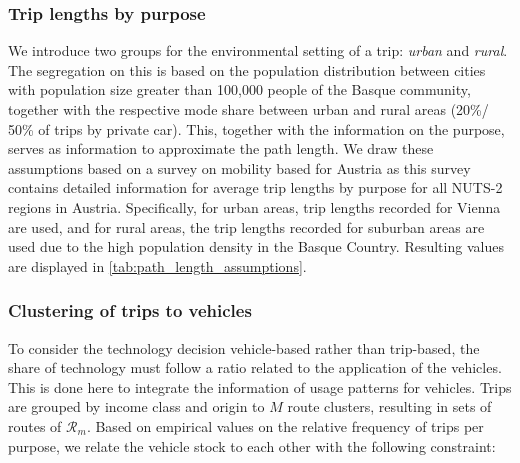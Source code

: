 \documentclass[preprint,review,11pt, authoryear]{elsarticle}
\begin{document}
        \subsubsection{Trip lengths by purpose}
        
        We introduce two groups for the environmental setting of a trip: \textit{urban} and \textit{rural}. The segregation on this is based on the population distribution between cities with population size greater than 100,000 people of the Basque community, together with the respective mode share between urban and rural areas (20\%/ 50\% of trips by private car). This, together with the information on the purpose, serves as information to approximate the path length.
        We draw these assumptions based on a survey on mobility based for Austria \citep{tomschy2016osterreich} as this survey contains detailed information for average trip lengths by purpose for all NUTS-2 regions in Austria. Specifically, for urban areas, trip lengths recorded for Vienna are used, and for rural areas, the trip lengths recorded for suburban areas are used due to the high population density in the Basque Country. Resulting values are displayed in \ref{tab:path_length_assumptions}.


        
        \subsubsection{Clustering of trips to vehicles}
        To consider the technology decision vehicle-based rather than trip-based, the share of technology must follow a ratio related to the application of the vehicles. This is done here to integrate the information of usage patterns for vehicles. Trips are grouped by income class and origin to $M$ route clusters, resulting in sets of routes of $\mathcal{R}_{m}$. Based on empirical values on the relative frequency of trips per purpose, we relate the vehicle stock to each other with the following constraint: 
\end{document}
